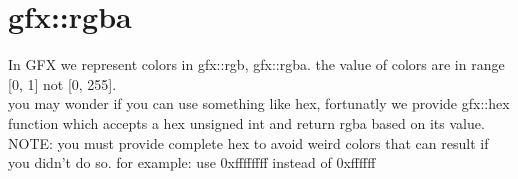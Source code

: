 \section{gfx::rgba}
    In GFX we represent colors in gfx::rgb, gfx::rgba.
  the value of colors are in range [0, 1] not [0, 255]. \\
  you may wonder if you can use something like hex,
  fortunatly we provide gfx::hex function which accepts
  a hex unsigned int and return rgba based on its value. \\
  NOTE: you must provide complete hex to avoid weird colors
  that can result if you didn't do so.
  for example:
    use 0xffffffff instead of 0xffffff
